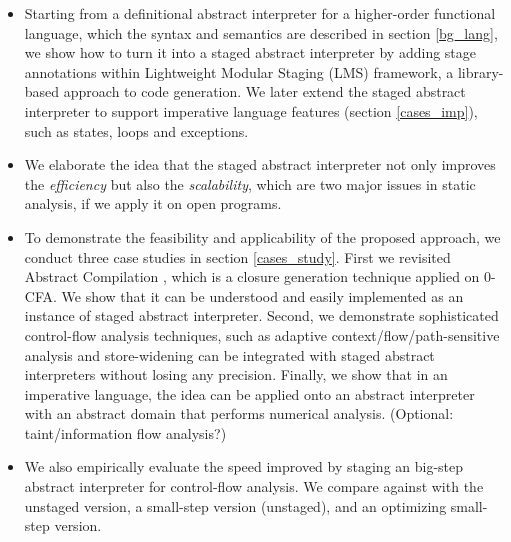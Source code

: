 \begin{itemize}
\item Starting from a definitional abstract interpreter for a higher-order functional language,
  which the syntax and semantics are described in section \ref{bg_lang},
  we show how to turn it into a staged abstract interpreter by adding stage annotations within
  Lightweight Modular Staging (LMS) framework, a library-based approach to code generation. 
  We later extend the staged abstract interpreter to support imperative language features 
  (section \ref{cases_imp}), such as states, loops and exceptions.
\item We elaborate the idea that the staged abstract interpreter not only improves the \textit{efficiency}
  but also the \textit{scalability}, which are two major issues in static analysis, if we apply it on open
  programs. 
\item To demonstrate the feasibility and applicability of the proposed approach, we conduct three case studies in section \ref{cases_study}. 
  First we revisited Abstract Compilation \cite{Boucher:1996:ACN:647473.727587}, which is a closure generation 
  technique applied on 0-CFA. We show that it can be understood and easily implemented as an instance of 
  staged abstract interpreter. 
  Second, we demonstrate sophisticated control-flow analysis techniques, such as adaptive context/flow/path-sensitive 
  analysis and store-widening can be integrated with staged abstract interpreters without losing any precision.
  Finally, we show that in an imperative language, the idea can be applied onto an abstract interpreter with
  an abstract domain that performs numerical analysis.
  (Optional: taint/information flow analysis?)
\item We also empirically evaluate the speed improved by staging an big-step abstract interpreter 
  for control-flow analysis. We compare against with the unstaged version, a small-step version (unstaged), 
  and an optimizing small-step version.
\end{itemize}
